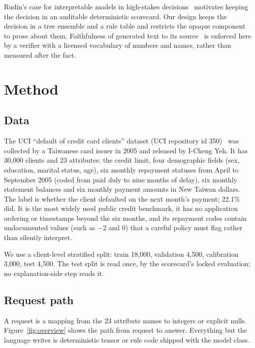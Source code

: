 \documentclass[twocolumn,10pt]{article}
\begin{document}
Rudin's case for interpretable models in high-stakes decisions~\cite{rudin2019stop} motivates keeping the decision in an
auditable deterministic scorecard. Our design keeps the decision in a tree ensemble and a rule table and restricts the opaque component
to prose about them. Faithfulness of generated text to its source~\cite{maynez2020faithfulness} is enforced here by a
verifier with a licensed vocabulary of numbers and names, rather than measured after the fact.

\section{Method}
\label{sec:method}

\subsection{Data}

The UCI ``default of credit card clients'' dataset (UCI repository id 350)~\cite{uci350,yeh2009comparisons} was collected
by a Taiwanese card issuer in 2005 and released by I-Cheng Yeh. It has 30{,}000 clients and 23 attributes: the credit
limit, four demographic fields (sex, education, marital status, age), six monthly repayment statuses from April to
September 2005 (coded from paid duly to nine months of delay), six monthly statement balances and six monthly payment
amounts in New Taiwan dollars. The label is whether the client defaulted on the next month's payment; 22.1\% did. It is
the most widely used public credit benchmark, it has no application ordering or timestamps beyond the six months, and its
repayment codes contain undocumented values (such as $-2$ and $0$) that a careful policy must flag rather than silently
interpret.

We use a client-level stratified split: train 18{,}000, validation 4{,}500, calibration 3{,}000, test 4{,}500. The test
split is read once, by the scorecard's locked evaluation; no explanation-side step reads it.

\subsection{Request path}

A request is a mapping from the 23 attribute names to integers or explicit nulls. Figure~\ref{fig:overview} shows the path
from request to answer. Everything but the language writer is deterministic tensor or rule code shipped with the model class.
\end{document}
